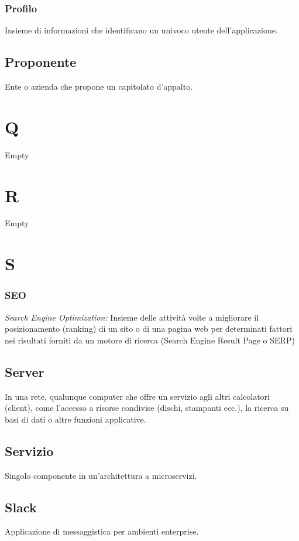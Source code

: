 \subsubsection*{Profilo}
Insieme di informazioni che identificano un univoco utente dell'applicazione.

\subsection*{Proponente}
Ente o azienda che propone un capitolato d'appalto.

\section*{Q}
Empty

\section*{R}
Empty

\section*{S}
\subsubsection*{SEO}
\textit{Search Engine Optimization:} Insieme delle attività volte a migliorare il posizionamento (ranking) di un sito o di una pagina web per determinati fattori nei risultati forniti
da un motore di ricerca (Search Engine Result Page o SERP)

\subsection*{Server}
In una rete, qualunque computer che offre un servizio agli altri calcolatori (client), come l'accesso a risorse condivise (dischi, stampanti ecc.), la ricerca su basi di dati o altre funzioni applicative.

\subsection*{Servizio}
Singolo componente in un'architettura a microservizi.

\subsection*{Slack}
Applicazione di messaggistica per ambienti enterprise.

